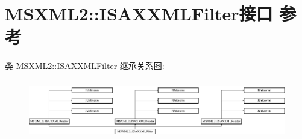 \hypertarget{interface_m_s_x_m_l2_1_1_i_s_a_x_x_m_l_filter}{}\section{M\+S\+X\+M\+L2\+:\+:I\+S\+A\+X\+X\+M\+L\+Filter接口 参考}
\label{interface_m_s_x_m_l2_1_1_i_s_a_x_x_m_l_filter}
类 M\+S\+X\+M\+L2\+:\+:I\+S\+A\+X\+X\+M\+L\+Filter 继承关系图\+:\begin{figure}[H]
\begin{center}
\leavevmode
\includegraphics[height=2.651515cm]{interface_m_s_x_m_l2_1_1_i_s_a_x_x_m_l_filter}
\end{center}
\end{figure}
